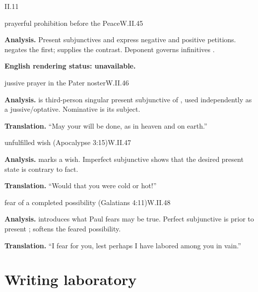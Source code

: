 \begin{courseunit}{II.11}
\begin{workedexample}{prayerful prohibition before the Peace}{W.II.45}

\textbf{Analysis.}  Present subjunctives  and  express
negative and positive petitions.   negates the first;  supplies the
contrast.  Deponent  governs infinitives .

\textbf{English rendering status: unavailable.}
\end{workedexample}

\begin{workedexample}{jussive prayer in the Pater noster}{W.II.46}

\textbf{Analysis.}   is third-person singular present subjunctive of ,
used independently as a jussive/optative.  Nominative  is its subject.

\textbf{Translation.}  ``May your will be done, as in heaven and on earth.''
\end{workedexample}

\begin{workedexample}{unfulfilled wish (Apocalypse 3:15)}{W.II.47}

\textbf{Analysis.}   marks a wish.  Imperfect subjunctive  shows
that the desired present state is contrary to fact.

\textbf{Translation.}  ``Would that you were cold or hot!''
\end{workedexample}

\begin{workedexample}{fear of a completed possibility (Galatians 4:11)}{W.II.48}

\textbf{Analysis.}   introduces what Paul fears may be true.  Perfect subjunctive
 is prior to present ;  softens the feared
possibility.

\textbf{Translation.}  ``I fear for you, lest perhaps I have labored among you in vain.''
\end{workedexample}

\section{Writing laboratory}


\end{courseunit}
